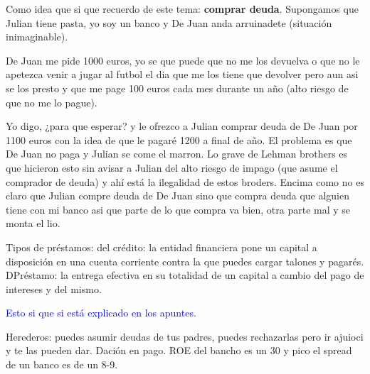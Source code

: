 \documentclass[nochap,palatino,shortheader]{apuntes}
\begin{document}
Como idea que si que recuerdo de este tema: \textbf{comprar deuda}. Supongamos que Julian tiene pasta, yo soy un banco y De Juan anda arruinadete (situación inimaginable).

De Juan me pide 1000 euros, yo se que puede que no me los devuelva o que no le apetezca venir a jugar al futbol el dia que me los tiene que devolver pero aun asi se los presto y que me page 100 euros cada mes durante un año (alto riesgo de que no me lo pague).

Yo digo, ¿para que esperar? y le ofrezco a Julian comprar deuda de De Juan por 1100 euros con la idea de que le pagaré 1200 a final de año. El problema es que De Juan no paga y Julian se come el marron. Lo grave de Lehman brothers es que hicieron esto sin avisar a Julian del alto riesgo de impago (que asume el comprador de deuda) y ahí está la ilegalidad de estos broders. Encima como no es claro que Julian compre deuda de De Juan sino que compra deuda que alguien tiene con mi banco asi que parte de lo que compra va bien, otra parte mal y se monta el lio.

\color{black}

Tipos de préstamos: del crédito: la entidad financiera pone un capital a disposición en una cuenta corriente contra la que puedes cargar talones y pagarés. DPréstamo: la entrega efectiva en su totalidad de un capital a cambio del pago de intereses y del mismo.

\textcolor{blue}{Esto si que si está explicado en los apuntes.}

Herederos: puedes asumir deudas de tus padres, puedes rechazarlas pero ir ajuioci y te las pueden dar. Dación en pago. ROE del bancho es un 30 y pico el spread de un banco es de un 8-9.

\color{blue}
\end{document}
